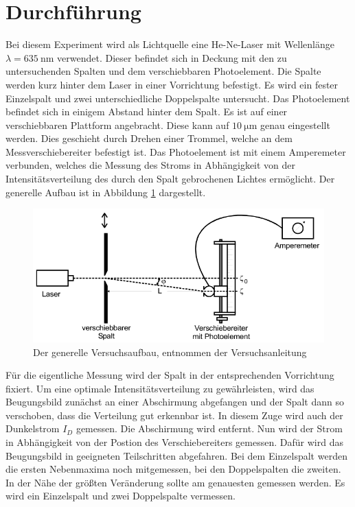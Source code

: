 \section{Durchführung}
\label{sec:Durchführung}

Bei diesem Experiment wird als Lichtquelle eine He-Ne-Laser mit Wellenlänge $\lambda = \SI{635}{\nano\metre}$ verwendet.
Dieser befindet sich in Deckung mit den zu untersuchenden Spalten und dem verschiebbaren Photoelement.
Die Spalte werden kurz hinter dem Laser in einer Vorrichtung befestigt.
Es wird ein fester Einzelspalt und zwei unterschiedliche Doppelspalte untersucht.
Das Photoelement befindet sich in einigem Abstand hinter dem Spalt.
Es ist auf einer verschiebbaren Plattform angebracht.
Diese kann auf $\SI{10}{\micro\metre}$ genau eingestellt werden.
Dies geschieht durch Drehen einer Trommel, welche an dem Messverschiebereiter befestigt ist.
Das Photoelement ist mit einem Amperemeter verbunden, welches die Messung des Stroms in Abhängigkeit von der Intensitätsverteilung des durch den Spalt gebrochenen Lichtes ermöglicht.
Der generelle Aufbau ist in Abbildung \ref{fig:Aufbau} dargestellt.

\begin{figure}
  \centering
  \includegraphics[scale=0.7]{images/Aufbau.png}
  \caption{Der generelle Versuchsaufbau, entnommen der Versuchsanleitung \cite[36]{1}}
  \label{fig:Aufbau}
\end{figure}

Für die eigentliche Messung wird der Spalt in der entsprechenden Vorrichtung fixiert.
Um eine optimale Intensitätsverteilung zu gewährleisten, wird das Beugungsbild zunächst an einer Abschirmung abgefangen und der Spalt dann so verschoben, dass die Verteilung gut erkennbar ist.
In diesem Zuge wird auch der Dunkelstrom $I_D$ gemessen.
Die Abschirmung wird entfernt.
Nun wird der Strom in Abhängigkeit von der Postion des Verschiebereiters gemessen.
Dafür wird das Beugungsbild in geeigneten Teilschritten abgefahren.
Bei dem Einzelspalt werden die ersten Nebenmaxima noch mitgemessen, bei den Doppelspalten die zweiten.
In der Nähe der größten Veränderung sollte am genauesten gemessen werden.
Es wird ein Einzelspalt und zwei Doppelspalte vermessen.
